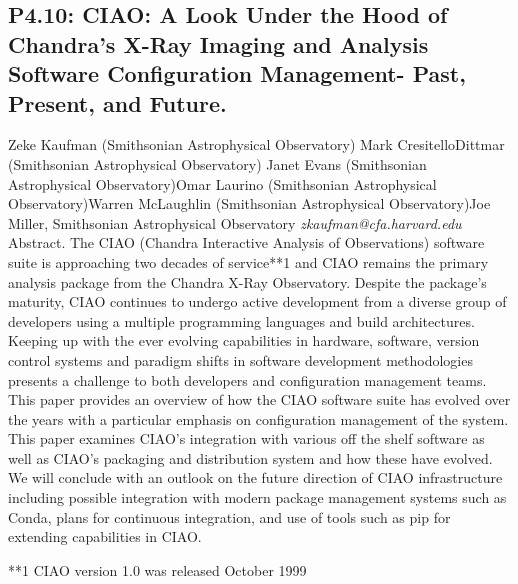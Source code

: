 \documentclass{report}
\begin{document}
\subsection*{P4.10: CIAO: A Look Under the Hood of Chandra's X-Ray Imaging and Analysis Software Configuration Management- Past, Present, and Future.}
\bigskip
Zeke Kaufman (Smithsonian Astrophysical Observatory) \newline Mark CresitelloDittmar (Smithsonian Astrophysical Observatory) \newline  Janet Evans (Smithsonian Astrophysical Observatory)\newline  Omar Laurino (Smithsonian Astrophysical Observatory)\newline Warren McLaughlin (Smithsonian Astrophysical Observatory)\newline  Joe Miller, Smithsonian Astrophysical Observatory\newline\newline
{\it zkaufman@cfa.harvard.edu}\newline
\newline\newline
Abstract.       The CIAO (Chandra Interactive Analysis of Observations) software suite is approaching two decades of service**1 and CIAO remains the primary analysis package from the Chandra X-Ray Observatory. Despite the package's maturity, CIAO continues to undergo active development from a diverse group of developers using a multiple programming languages and build architectures. Keeping up with the ever evolving capabilities in hardware, software, version control systems and paradigm shifts in software development methodologies presents a challenge to both developers and configuration management teams. This paper provides an overview of how the CIAO software suite has evolved over the years with a particular emphasis on configuration management of the system. This paper examines CIAO's integration with various off the shelf software as well as CIAO's packaging and distribution system and how these have evolved. We will conclude with an outlook on the future direction of CIAO infrastructure including possible integration with modern package management systems such as Conda, plans for continuous integration, and use of tools such as pip for extending capabilities in CIAO.

**1  CIAO version 1.0 was released October 1999\newline
\newpage
\end{document}

